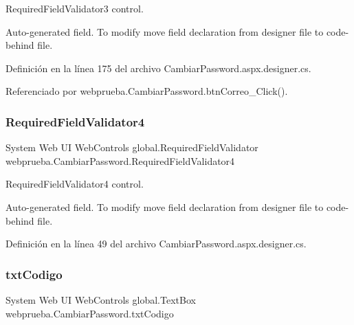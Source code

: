 Required\+Field\+Validator3 control. 

Auto-\/generated field. To modify move field declaration from designer file to code-\/behind file. 

Definición en la línea 175 del archivo Cambiar\+Password.\+aspx.\+designer.\+cs.



Referenciado por webprueba.\+Cambiar\+Password.\+btn\+Correo\+\_\+\+Click().

\mbox{\label{classwebprueba_1_1_cambiar_password_ab1cb1ac57b69ed314bf45093d123a50a}} 
\subsubsection{\texorpdfstring{RequiredFieldValidator4}{RequiredFieldValidator4}}
{\footnotesize\ttfamily System Web UI Web\+Controls global.\+Required\+Field\+Validator webprueba.\+Cambiar\+Password.\+Required\+Field\+Validator4\hspace{0.3cm}{\ttfamily [protected]}}



Required\+Field\+Validator4 control. 

Auto-\/generated field. To modify move field declaration from designer file to code-\/behind file. 

Definición en la línea 49 del archivo Cambiar\+Password.\+aspx.\+designer.\+cs.

\mbox{\label{classwebprueba_1_1_cambiar_password_a25d2a6436d74e1f098a4fb346529f767}} 
\subsubsection{\texorpdfstring{txtCodigo}{txtCodigo}}
{\footnotesize\ttfamily System Web UI Web\+Controls global.\+Text\+Box webprueba.\+Cambiar\+Password.\+txt\+Codigo\hspace{0.3cm}{\ttfamily [protected]}}



